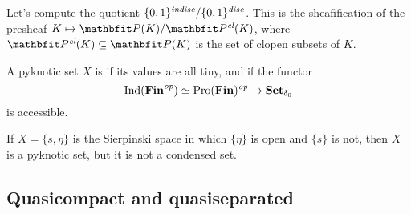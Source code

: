 \begin{exm}
	Let's compute the quotient $ \{ 0, 1 \}^{\textit{indisc}} / \{ 0, 1 \}^{\textit{disc}} $.
	This is the sheafification of the presheaf $ K \mapsto \PP(K) / \PP^{\textit{cl}}(K) $, where $ \PP^{\textit{cl}}(K) \subseteq \PP(K) $ is the set of clopen subsets of $ K $.
	
\end{exm}

\begin{dfn}
	A pyknotic set $ X $ is  if its values are all tiny, and if the functor
	\[
		\operatorname{Ind}(\textbf{\textup{Fin}}^{\textit{op}}) \simeq \operatorname{Pro}(\textbf{\textup{Fin}})^{\textit{op}} \to \textbf{\textup{Set}}_{\delta_0}
	\]
	is accessible.
\end{dfn}

\begin{exm}
	If $ X = \{s, \eta\} $ is the Sierpinski space in which $ \{ \eta \} $ is open and $ \{ s \} $ is not, then $ X $ is a pyknotic set, but it is not a condensed set.
\end{exm}

\subsection{Quasicompact and quasiseparated}






